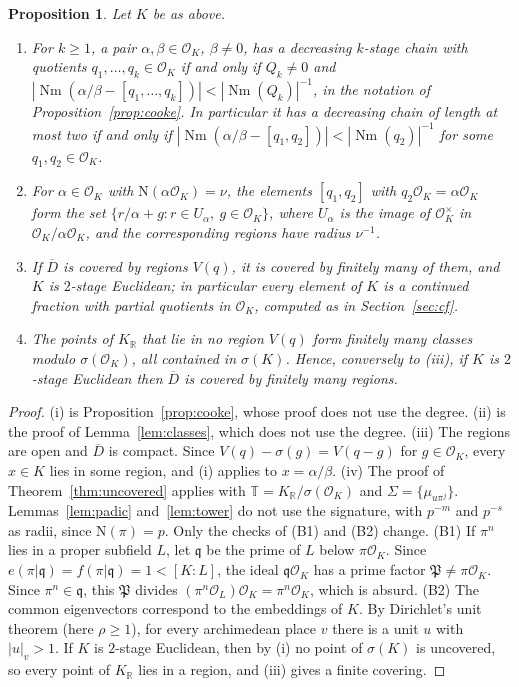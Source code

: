 \documentclass[11pt]{amsart}
\newtheorem{proposition}[theorem]{Proposition}
\theoremstyle{definition}
\theoremstyle{remark}
\numberwithin{equation}{section}
\newcommand{\R}{\mathbb{R}}
\newcommand{\cO}{\mathcal{O}}
\newcommand{\Nm}{\operatorname{Nm}}
\begin{document}
\begin{proposition}\label{prop:gen-basic}
Let $K$ be as above.
\begin{enumerate}
\item[(i)] For $k\ge1$, a pair $\alpha,\beta\in\cO_K$, $\beta\ne0$, has a decreasing $k$-stage
chain with quotients $q_1,\dots,q_k\in\cO_K$ if and only if $Q_k\ne0$ and
$|\Nm(\alpha/\beta-[q_1,\dots,q_k])|<|\Nm(Q_k)|^{-1}$, in the notation of
Proposition~\ref{prop:cooke}. In particular it has a decreasing chain of length at most two if
and only if $|\Nm(\alpha/\beta-[q_1,q_2])|<|\Nm(q_2)|^{-1}$ for some $q_1,q_2\in\cO_K$.
\item[(ii)] For $\alpha\in\cO_K$ with $\mathrm N(\alpha\cO_K)=\nu$, the elements $[q_1,q_2]$ with
$q_2\cO_K=\alpha\cO_K$ form the set $\{r/\alpha+g: r\in U_\alpha,\ g\in\cO_K\}$, where $U_\alpha$ is
the image of $\cO_K^\times$ in $\cO_K/\alpha\cO_K$, and the corresponding regions have radius
$\nu^{-1}$.
\item[(iii)] If $\overline D$ is covered by regions $V(q)$, it is covered by finitely many of them,
and $K$ is $2$-stage Euclidean; in particular every element of $K$ is a continued fraction with
partial quotients in $\cO_K$, computed as in Section~\ref{sec:cf}.
\item[(iv)] The points of $K_\R$ that lie in no region $V(q)$ form finitely many classes
modulo $\sigma(\cO_K)$, all contained in $\sigma(K)$. Hence, conversely to (iii), if $K$ is
$2$-stage Euclidean then $\overline D$ is covered by finitely many regions.
\end{enumerate}
\end{proposition}

\begin{proof}
(i) is Proposition~\ref{prop:cooke}, whose proof does not use the degree.
(ii) is the proof of Lemma~\ref{lem:classes}, which does not use the
degree.
(iii) The regions are open and $\overline D$ is compact. Since $V(q)-\sigma(g)=V(q-g)$ for
$g\in\cO_K$, every $x\in K$ lies in some region, and (i) applies to $x=\alpha/\beta$.
(iv) The proof of Theorem~\ref{thm:uncovered} applies with $\mathbb T=K_\R/\sigma(\cO_K)$
and $\Sigma=\{\mu_{u\pi^j}\}$. Lemmas~\ref{lem:padic} and~\ref{lem:tower} do not use the
signature, with $p^{-m}$ and $p^{-s}$ as radii, since $\mathrm N(\pi)=p$. Only the checks
of (B1) and (B2) change.
(B1) If $\pi^n$ lies in a proper subfield $L$, let $\mathfrak q$ be the prime of $L$ below
$\pi\cO_K$. Since $e(\pi|\mathfrak q)=f(\pi|\mathfrak q)=1<[K:L]$, the ideal $\mathfrak q\cO_K$
has a prime factor $\mathfrak P\ne\pi\cO_K$. Since $\pi^n\in\mathfrak q$, this $\mathfrak P$
divides $(\pi^n\cO_L)\cO_K=\pi^n\cO_K$, which is absurd.
(B2) The common eigenvectors correspond to the embeddings of $K$. By Dirichlet's unit theorem
(here $\rho\ge1$), for every archimedean place $v$ there is a unit $u$ with $|u|_v>1$.
If $K$ is $2$-stage Euclidean, then by (i) no point of $\sigma(K)$ is uncovered, so every point
of $K_\R$ lies in a region, and (iii) gives a finite covering.
\end{proof}
\end{document}
